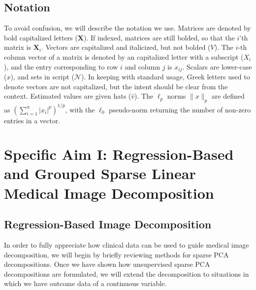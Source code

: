 \documentclass[11pt]{nih}
\begin{document}
\subsection*{Notation}
To avoid confusion, we will describe the notation we use.  Matrices are denoted by bold capitalized letters ($\mathbf{X}$). If indexed, matrices are still  bolded, so that the $i$'th matrix is $\mathbf{X}_i$. Vectors are capitalized and italicized, but not bolded ($V$).  The $i$-th column vector of a matrix is denoted by an capitalized letter with a subscript  ($X_i$), and the entry corresponding to row $i$ and column $j$ is $x_{ij}$.    Scalars are lower-case ($x$), and sets in script ($\mathcal{N}$).  In keeping with standard usage, Greek letters used to denote vectors are not  capitalized, but the intent should be clear from the context.   Estimated values are given hats ($\hat{v}$).  The $\ell_p$ norms $\|x\|_p$ are defined as $\left( \sum_{i=1}^n \vert x_i \vert ^p \right) ^{1/p}$, with the $\ell_0$ pseudo-norm returning the number of non-zero entries in a vector.
 
\section*{Specific Aim I: Regression-Based and Grouped Sparse Linear Medical Image Decomposition}
\subsection*{Regression-Based Image Decomposition}
In order to fully appreciate how clinical data can be used to guide medical image decomposition, we will begin by briefly reviewing methods for sparse PCA decompositions.  Once we have shown how unsupervised sparse PCA decompositions are formulated, we will extend the decomposition to situations in which we have outcome data of a continuous variable. 
\end{document}
